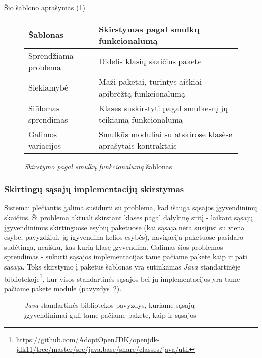 Šio šablono aprašymas (\ref{table:module})
\begin{figure}[H]
\begin{center}
    \begin{tabular}{|p{5cm}|p{10cm}|}
        \hline
        Šablonas & Skirstymas pagal smulkų funkcionalumą \\ [0.5ex]
        \hline\hline
        Sprendžiama problema & Didelis klasių skaičius pakete\\
        \hline
        Siekiamybė & Maži paketai, turintys aiškiai apibrėžtą funkcionalumą\\
        \hline
        Siūlomas sprendimas & Klases suskirstyti pagal smulkesnį jų teikiamą funkcionalumą \\
        \hline
        Galimos variacijos & Smulkūs moduliai su atskirose klasėse aprašytais kontraktais \\
        \hline
    \end{tabular}
\end{center}
\caption{\textit{Skirstymo pagal smulkų funkcionalumą} šablonas}
\label{table:module}
\end{figure}

\subsubsection{Skirtingų sąsajų implementacijų skirstymas}
Sistemai plečiantis galima susidurti su problema, kad išauga sąsajos įgyvendinimų skaičius.
Ši problema aktuali skirstant klases pagal dalykinę sritį - laikant sąsajų įgyvendinimus
skirtinguose esybių paketuose (kai sąsaja nėra susijusi su viena esybe, pavyzdžiui, ją įgyvendina kelios esybės),
navigacija paketuose pasidaro sudėtinga, neaišku, kas kurią klasę įgyvendina.
Galimas šios problemos sprendimas - sukurti sąsajos implementacijas tame pačiame pakete kaip ir pati sąsaja.
Toks skirstymo į paketus šablonas yra sutinkamas \textit{Java} standartinėje bibliotekoje\footnote{\url{https://github.com/AdoptOpenJDK/openjdk-jdk11/tree/master/src/java.base/share/classes/java/util}},
kur visos standartinės sąsajos bei jų implementacijos yra tame pačiame pakete module (pavyzdys~\ref{fig:implJava}).
\begin{figure}[H]
    \snugshade
    \endsnugshade
    \caption{\textit{Java} standartinės bibliotekos pavyzdys, kuriame sąsajų įgyvendinimai guli tame pačiame pakete, kaip ir sąsajos}
    \label{fig:implJava}
\end{figure}

